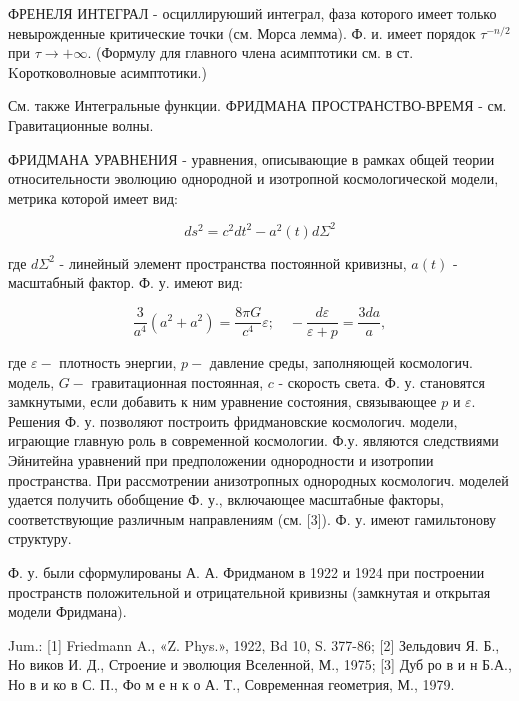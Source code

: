 \documentclass[10pt]{article}
\begin{document}
ФРЕНЕЛЯ ИНТЕГРАЛ - осциллируюший интеграл, фаза которого имеет только невырожденные критические точки (см. Морса лемма). Ф. и. имеет порядок $\tau^{-n / 2}$ при $\tau \rightarrow+\infty$. (Формулу для главного члена асимптотики см. в ст. Kоротковолновые асимптотики.)



См. также Интегральные функции. ФРИДМАНА ПРОСТРАНСТВО-ВРЕМЯ - см. Гравитационные волны.



ФРИДМАНА УРАВНЕНИЯ - уравнения, описывающие в рамках общей теории относительности эволюцию однородной и изотропной космологической модели, метрика которой имеет вид:



\[

d s^{2}=c^{2} d t^{2}-a^{2}(t) d \Sigma^{2}

\]



где $d \Sigma^{2}$ - линейный элемент пространства постоянной кривизны, $a(t)$ - масштабный фактор. Ф. у. имеют вид:



\[

\frac{3}{a^{4}}\left(a^{2}+a^{2}\right)=\frac{8 \pi G}{c^{4}} \varepsilon ; \quad-\frac{d \varepsilon}{\varepsilon+p}=\frac{3 d a}{a},

\]



где $\varepsilon-$ плотность энергии, $p-$ давление среды, заполняющей космологич. модель, $G-$ гравитационная постоянная, $c$ - скорость света. Ф. у. становятся замкнутыми, если добавить к ним уравнение состояния, связывающее $p$ и $\varepsilon$. Решения Ф. у. позволяют построить фридмановские космологич. модели, играющие главную роль в современной космологии. Ф.у. являются следствиями Эйнитейна уравнений при предположении однородности и изотропии пространства. При рассмотрении анизотропных однородных космологич. моделей удается получить обобщение Ф. у., включающее масштабные факторы, соответствующие различным направлениям (см. [3]). Ф. у. имеют гамильтонову структуру.



Ф. у. были сформулированы А. А. Фридманом в 1922 и 1924 при построении пространств положительной и отрицательной кривизны (замкнутая и открытая модели Фридмана).



Jum.: [1] Friedmann A., «Z. Phys.», 1922, Bd 10, S. 377-86; [2] Зельдович Я. Б., Но виков И. Д., Строение и эволюция Вселенной, М., 1975; [3] Дуб ро в и н Б.А., Но в и ко в С. П., Фо м е н к о А. Т., Современная геометрия, М., 1979.
\end{document}
